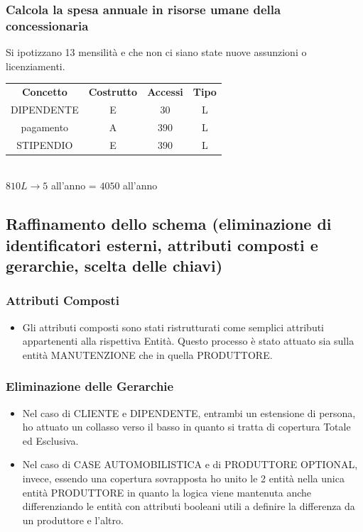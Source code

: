 \documentclass[11pt]{article}
\begin{document}
\subsubsection{Calcola la spesa annuale in risorse umane della concessionaria}

Si ipotizzano 13 mensilità e che non ci siano state nuove assunzioni o licenziamenti.

\begin{table}[H]
    \centering
    \begin{tabular}{c c c c}
        \rowcolor{red!20!}
        \textbf{Concetto} & \textbf{Costrutto} & \textbf{Accessi} &
        \textbf{Tipo}\\
        DIPENDENTE & E & 30 & L \\
        pagamento & A & 390 & L \\
        STIPENDIO & E & 390 & L \\
    \end{tabular}\\
    \( 810L \rightarrow 5 \) all'anno = \( 4050 \) all'anno 
\end{table}

\subsection{Raffinamento dello schema (eliminazione di identificatori esterni,
attributi composti e gerarchie, scelta delle chiavi)}

\subsubsection{Attributi Composti}
\begin{itemize}
    \item Gli attributi composti sono stati ristrutturati come semplici
    attributi appartenenti alla rispettiva Entità. Questo processo è stato
    attuato sia sulla entità MANUTENZIONE che in quella PRODUTTORE.
\end{itemize}

\subsubsection{Eliminazione delle Gerarchie}

\begin{itemize}
    \item Nel caso di CLIENTE e DIPENDENTE, entrambi un estensione di persona,
    ho attuato un collasso verso il basso in quanto si tratta di copertura
    Totale ed Esclusiva.
    \item Nel caso di CASE AUTOMOBILISTICA e di PRODUTTORE OPTIONAL, invece,
    essendo una copertura sovrapposta ho unito le 2 entità nella unica entità
    PRODUTTORE in quanto la logica viene mantenuta anche differenziando le
    entità con attributi booleani utili a definire la differenza da un produttore e
    l'altro.
\end{itemize}
\end{document}
